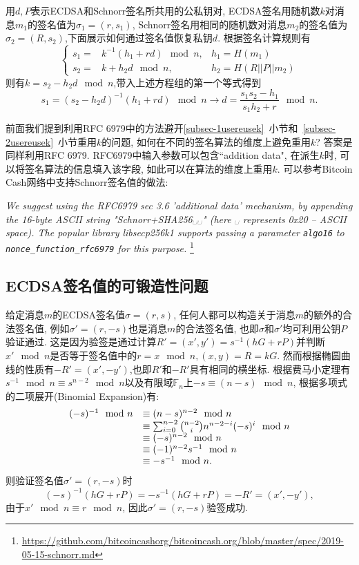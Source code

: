 \documentclass{article}
\newcommand{\F}{\mathbb{F}}
\newcommand{\code}[1]{\lstinline!#1!}
\begin{document}
用$d, P$表示ECDSA和Schnorr签名所共用的公私钥对, ECDSA签名用随机数$k$对消息$m_1$的签名值为$\sigma_1 = (r, s_1)$,
Schnorr签名用相同的随机数对消息$m_2$的签名值为$\sigma_2 = (R, s_2)$,下面展示如何通过签名值恢复私钥$d$.
根据签名计算规则有
\begin{equation}\nonumber
\left\{
\begin{array}{lll}
s_1 = & k^{-1}(h_1 + rd) \mod n, & h_1 = H(m_1)\\
s_2 = & k + h_2d \mod n, & h_2 = H(R||P||m_2)
\end{array}
\right.
\end{equation}
则有$k = s_2 - h_2d\mod n$,带入上述方程组的第一个等式得到
$$
s_1 =  (s_2 - h_2d)^{-1}(h_1 + rd) \mod n \rightarrow d = \dfrac{s_1s_2 - h_1}{s_1h_2 + r} \mod n.
$$

前面我们提到利用RFC 6979中的方法避开\ref{subsec-1usereusek}~小节和~\ref{subsec-2usereusek}~小节重用$k$的问题,
如何在不同的签名算法的维度上避免重用$k$? 答案是同样利用RFC 6979. 
RFC6979中输入参数可以包含``addition data", 在派生$k$时, 可以将签名算法的信息填入该字段, 如此可以在算法的维度上重用$k$.
可以参考Bitcoin Cash网络中支持Schnorr签名值的做法:

\textit{
We suggest using the RFC6979 sec 3.6 'additional data' mechanism, by appending the 16-byte ASCII string "Schnorr+SHA256␣␣" (here ␣ represents 0x20 -- ASCII space). The popular library libsecp256k1 supports passing a parameter \code{algo16} to \code{nonce_function_rfc6979} for this purpose.
}\footnote{\url{https://github.com/bitcoincashorg/bitcoincash.org/blob/master/spec/2019-05-15-schnorr.md}}

\subsection{ECDSA签名值的可锻造性问题\label{subsec-lowers}}

给定消息$m$的ECDSA签名值$\sigma=(r, s)$, 任何人都可以构造关于消息$m$的额外的合法签名值,
例如$\sigma'=(r, -s)$也是消息$m$的合法签名值, 也即$\sigma$和$\sigma'$均可利用公钥$P$验证通过.
这是因为验签是通过计算$R'=(x',y')=s^{-1}(hG + rP)$并判断$x' \mod n$是否等于签名值中的$r = x \mod n, (x, y) = R = kG$. 
然而根据椭圆曲线的性质有$-R' = (x', -y')$,也即$R'$和$-R'$具有相同的横坐标.
根据费马小定理有$s^{-1}\mod n \equiv s^{n-2} \mod n$以及有限域$\F_n$上$-s \equiv (n-s) \mod n$, 
根据多项式的二项展开(Binomial Expansion)有:
$$
\begin{array}{ll}
(-s)^{-1}\mod n & \equiv (n-s)^{n-2} \mod n \\
 & \equiv \sum_{i=0}^{n-2}\tbinom{n-2}{i}n^{n-2-i}(-s)^{i} \mod n \\
 & \equiv (-s)^{n-2} \mod n \\ 
 &  \equiv (-1)^{n-2}s^{-1}\mod n \\
 & \equiv -s^{-1}\mod n.
 \end{array}
$$
则验证签名值$\sigma'  = (r, -s)$时
$$
(-s)^{-1}(hG+rP) = -s^{-1}(hG + rP) = -R' = (x', -y'),
$$
由于$x' \mod n \equiv r \mod n$, 因此$\sigma'  = (r, -s)$验签成功.
\end{document}
